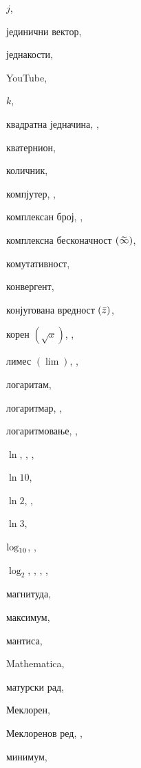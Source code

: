 \begin{theindex}
  \indexspace

  \item $j$, 
  \item јединични вектор, 
  \item једнакости, 
  \interskip
  \item {\sf  YouTube}, 

  \indexspace

  \item $k$, 
  \item квадратна једначина, , 
  \item кватернион, 
  \item количник, 
  \item компјутер, , 
  \item комплексан број, , 
  \item комплексна бесконачност $({\,\widetilde{\!\infty\!}\,})$, 
  \item комутативност, 
  \item конвергент, 
  \item конјугована вредност $({\bar z})$, 
  \item корен $(\sqrt x)$, , 

  \indexspace

  \item лимес $(\lim)$, , 
  \item логаритам, 
  \item логаритмар, , 
  \item логаритмовање, , 
  \interskip
  \item $\ln$, , , 
  \item $\ln 10$, 
  \item $\ln 2$, , 
  \item $\ln3$, 
  \item $\log_{10}$, , 
  \item $\log_2$, , , , 

  \indexspace

  \item магнитуда, 
  \item максимум, 
  \item мантиса, 
  \item Mathematica, 
  \item матурски рад, 
  \item Меклорен, 
  \item Меклоренов ред, , 
  \item минимум, 


\end{theindex}
